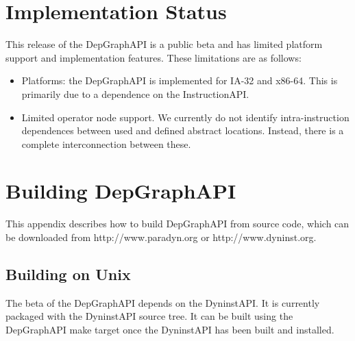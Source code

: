 \documentclass[12pt,titlepage]{article}
\begin{document}
\section{Implementation Status}

This release of the DepGraphAPI is a public beta and has limited
platform support and implementation features. These limitations are as
follows:
\begin{itemize}
\item Platforms: the DepGraphAPI is implemented for IA-32 and
  x86-64. This is primarily due to a dependence on the InstructionAPI.
\item Limited operator node support. We currently do not identify
  intra-instruction dependences between used and defined abstract
  locations. Instead, there is a complete interconnection between
  these. 
\end{itemize}


\section{Building DepGraphAPI}
This appendix describes how to build DepGraphAPI from source code,
which can be downloaded from http://www.paradyn.org or
http://www.dyninst.org.

\subsection{Building on Unix}
The beta of the DepGraphAPI depends on the DyninstAPI. It is currently
packaged with the DyninstAPI source tree. It can be built using the
DepGraphAPI make target once the DyninstAPI has been built and
installed.
\end{document}
